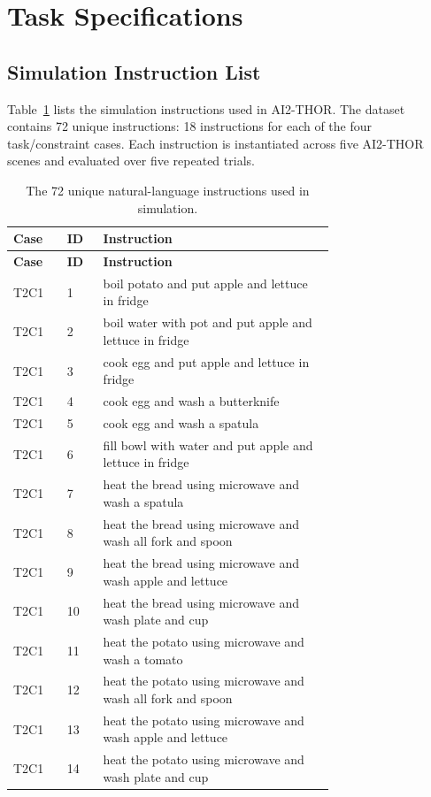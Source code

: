 \documentclass[letterpaper,10pt,onecolumn]{IEEEtran}
\begin{document}
\section{Task Specifications}
\subsection{Simulation Instruction List}\label{supp:sim_instructions}
Table~\ref{tab:supp_sim_instructions} lists the simulation instructions used
in AI2-THOR. The dataset contains 72 unique instructions: 18 instructions for
each of the four task/constraint cases. Each instruction is instantiated
across five AI2-THOR scenes and evaluated over five repeated trials.
{\small
\begin{longtable}{@{}llp{0.72\linewidth}@{}}
\caption{The 72 unique natural-language instructions used in simulation.}
\label{tab:supp_sim_instructions}\\
\toprule
\textbf{Case} & \textbf{ID} & \textbf{Instruction} \\
\midrule
\endfirsthead
\toprule
\textbf{Case} & \textbf{ID} & \textbf{Instruction} \\
\midrule
\endhead
\bottomrule
\endfoot
T2C1 & 1 & boil potato and put apple and lettuce in fridge \\
T2C1 & 2 & boil water with pot and put apple and lettuce in fridge \\
T2C1 & 3 & cook egg and put apple and lettuce in fridge \\
T2C1 & 4 & cook egg and wash a butterknife \\
T2C1 & 5 & cook egg and wash a spatula \\
T2C1 & 6 & fill bowl with water and put apple and lettuce in fridge \\
T2C1 & 7 & heat the bread using microwave and wash a spatula \\
T2C1 & 8 & heat the bread using microwave and wash all fork and spoon \\
T2C1 & 9 & heat the bread using microwave and wash apple and lettuce \\
T2C1 & 10 & heat the bread using microwave and wash plate and cup \\
T2C1 & 11 & heat the potato using microwave and wash a tomato \\
T2C1 & 12 & heat the potato using microwave and wash all fork and spoon \\
T2C1 & 13 & heat the potato using microwave and wash apple and lettuce \\
T2C1 & 14 & heat the potato using microwave and wash plate and cup \\

\end{longtable}}
\end{document}
